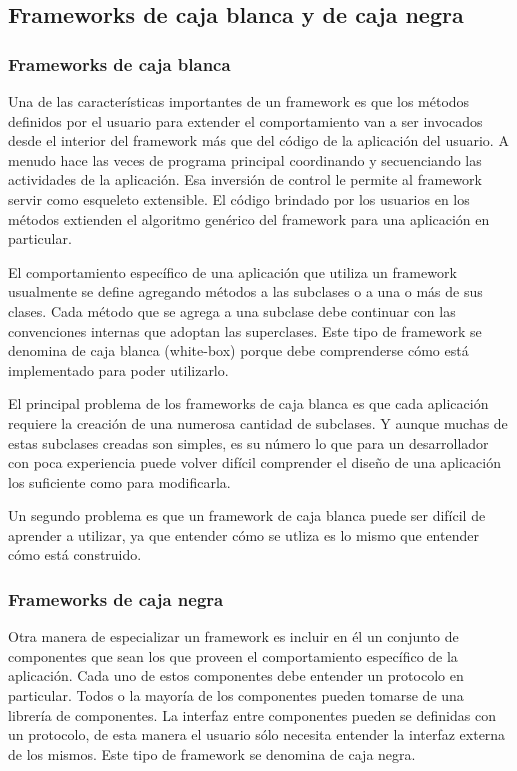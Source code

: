 \subsection{Frameworks de caja blanca y de caja negra}
\subsubsection{Frameworks de caja blanca}

	Una de las características importantes de un framework es que los métodos definidos por el usuario para extender el comportamiento van a ser invocados desde el interior del framework más que del código de la aplicación del usuario. A menudo hace las veces de programa principal coordinando y secuenciando las actividades de la aplicación. Esa inversión de control le permite al framework servir como esqueleto extensible. El código brindado por los usuarios en los métodos extienden el algoritmo genérico del framework para una aplicación en particular. 
	
	El comportamiento específico de una aplicación que utiliza un framework usualmente se define agregando métodos a las subclases o a una o más de sus clases. Cada método que se agrega a una subclase debe continuar con las convenciones internas que adoptan las superclases. Este tipo de framework se denomina de caja blanca (white-box) porque debe comprenderse cómo está implementado para poder utilizarlo.
	
	El principal problema de los frameworks de caja blanca es que cada aplicación requiere la creación de una numerosa cantidad  de subclases. Y aunque muchas de estas subclases creadas son simples, es su número lo que para un desarrollador con poca experiencia puede volver difícil comprender el diseño de una aplicación los suficiente como para modificarla.
	
	Un segundo problema es que un framework de caja blanca puede ser difícil de aprender a utilizar, ya que entender cómo se utliza es lo mismo que entender cómo está construido.
	
\subsubsection{Frameworks de caja negra}

	Otra manera de especializar un framework es incluir en él un conjunto de componentes que sean los que proveen el comportamiento específico de la aplicación. Cada uno de estos componentes debe entender un protocolo en particular. Todos o la mayoría de los componentes pueden tomarse de una librería de componentes. La interfaz entre componentes pueden se definidas con un protocolo, de esta manera el usuario sólo necesita entender la interfaz externa de los mismos. Este tipo de framework se denomina de caja negra.
	
